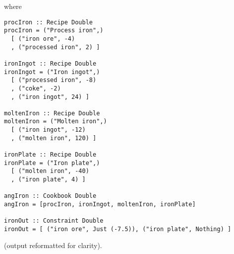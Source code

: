 \documentclass[12pt]{article}
\begin{document}
where

\begin{verbatim}
procIron :: Recipe Double
procIron = ("Process iron",)
  [ ("iron ore", -4)
  , ("processed iron", 2) ]

ironIngot :: Recipe Double
ironIngot = ("Iron ingot",)
  [ ("processed iron", -8)
  , ("coke", -2)
  , ("iron ingot", 24) ]

moltenIron :: Recipe Double
moltenIron = ("Molten iron",)
  [ ("iron ingot", -12)
  , ("molten iron", 120) ]

ironPlate :: Recipe Double
ironPlate = ("Iron plate",)
  [ ("molten iron", -40)
  , ("iron plate", 4) ]

angIron :: Cookbook Double
angIron = [procIron, ironIngot, moltenIron, ironPlate]

ironOut :: Constraint Double
ironOut = [ ("iron ore", Just (-7.5)), ("iron plate", Nothing) ]
\end{verbatim}
(output reformatted for clarity).
\end{document}

